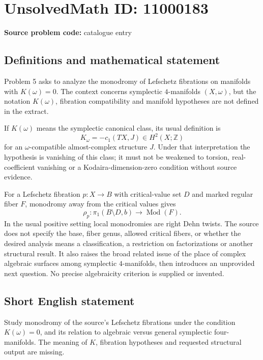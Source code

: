 \documentclass[11pt]{article}
\newcommand{\Z}{\mathbb{Z}}
\begin{document}
\section*{UnsolvedMath ID: 11000183}
\textbf{Source problem code:} catalogue entry
\subsection{Definitions and mathematical statement}
Problem 5 asks to analyze the monodromy of Lefschetz fibrations on manifolds with \(K(\omega)=0\). The context concerns symplectic \(4\)-manifolds \((X,\omega)\), but the notation \(K(\omega)\), fibration compatibility and manifold hypotheses are not defined in the extract.

If \(K(\omega)\) means the symplectic canonical class, its usual definition is
\[
 K_\omega=-c_1(TX,J)\in H^2(X;\Z)
\]
for an \(\omega\)-compatible almost-complex structure \(J\). Under that interpretation the hypothesis is vanishing of this class; it must not be weakened to torsion, real-coefficient vanishing or a Kodaira-dimension-zero condition without source evidence.

For a Lefschetz fibration \(p:X\to B\) with critical-value set \(D\) and marked regular fiber \(F\), monodromy away from the critical values gives
\[
 \rho_p:\pi_1(B\setminus D,b)\longrightarrow\operatorname{Mod}(F).
\]
In the usual positive setting local monodromies are right Dehn twists. The source does not specify the base, fiber genus, allowed critical fibers, or whether the desired analysis means a classification, a restriction on factorizations or another structural result. It also raises the broad related issue of the place of complex algebraic surfaces among symplectic \(4\)-manifolds, then introduces an unprovided next question. No precise algebraicity criterion is supplied or invented.
\subsection{Short English statement}
Study monodromy of the source's Lefschetz fibrations under the condition \(K(\omega)=0\), and its relation to algebraic versus general symplectic four-manifolds. The meaning of \(K\), fibration hypotheses and requested structural output are missing.
\end{document}
